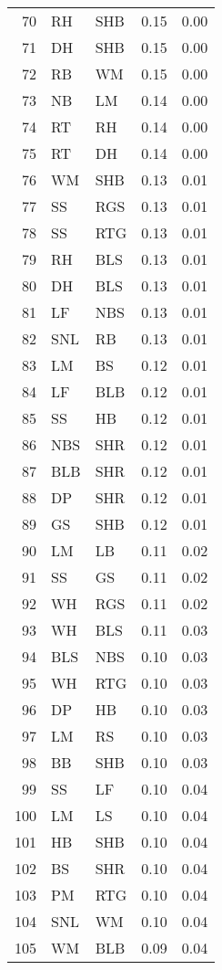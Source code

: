 \begin{table}[ht]
\begin{tabular}{rllrr}
  70 & RH & SHB & 0.15 & 0.00 \\ 
  71 & DH & SHB & 0.15 & 0.00 \\ 
  72 & RB & WM & 0.15 & 0.00 \\ 
  73 & NB & LM & 0.14 & 0.00 \\ 
  74 & RT & RH & 0.14 & 0.00 \\ 
  75 & RT & DH & 0.14 & 0.00 \\ 
  76 & WM & SHB & 0.13 & 0.01 \\ 
  77 & SS & RGS & 0.13 & 0.01 \\ 
  78 & SS & RTG & 0.13 & 0.01 \\ 
  79 & RH & BLS & 0.13 & 0.01 \\ 
  80 & DH & BLS & 0.13 & 0.01 \\ 
  81 & LF & NBS & 0.13 & 0.01 \\ 
  82 & SNL & RB & 0.13 & 0.01 \\ 
  83 & LM & BS & 0.12 & 0.01 \\ 
  84 & LF & BLB & 0.12 & 0.01 \\ 
  85 & SS & HB & 0.12 & 0.01 \\ 
  86 & NBS & SHR & 0.12 & 0.01 \\ 
  87 & BLB & SHR & 0.12 & 0.01 \\ 
  88 & DP & SHR & 0.12 & 0.01 \\ 
  89 & GS & SHB & 0.12 & 0.01 \\ 
  90 & LM & LB & 0.11 & 0.02 \\ 
  91 & SS & GS & 0.11 & 0.02 \\ 
  92 & WH & RGS & 0.11 & 0.02 \\ 
  93 & WH & BLS & 0.11 & 0.03 \\ 
  94 & BLS & NBS & 0.10 & 0.03 \\ 
  95 & WH & RTG & 0.10 & 0.03 \\ 
  96 & DP & HB & 0.10 & 0.03 \\ 
  97 & LM & RS & 0.10 & 0.03 \\ 
  98 & BB & SHB & 0.10 & 0.03 \\ 
  99 & SS & LF & 0.10 & 0.04 \\ 
  100 & LM & LS & 0.10 & 0.04 \\ 
  101 & HB & SHB & 0.10 & 0.04 \\ 
  102 & BS & SHR & 0.10 & 0.04 \\ 
  103 & PM & RTG & 0.10 & 0.04 \\ 
  104 & SNL & WM & 0.10 & 0.04 \\ 
  105 & WM & BLB & 0.09 & 0.04 \\ 

\end{tabular}
\end{table}
